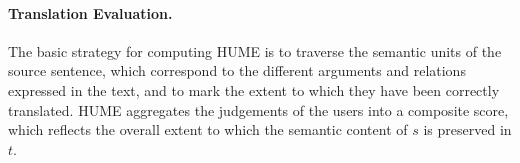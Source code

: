 \documentclass[11pt]{article}
\begin{document}
%
%  


\paragraph{Translation Evaluation.}
The basic strategy for computing HUME is to traverse the semantic units
of the source sentence, which correspond to the different arguments and relations expressed
in the text, and to mark the extent to which they have been correctly translated.
HUME aggregates the judgements of the users into a composite score, 
which reflects the overall extent to which the semantic content of $s$ is preserved in $t$.
\end{document}
